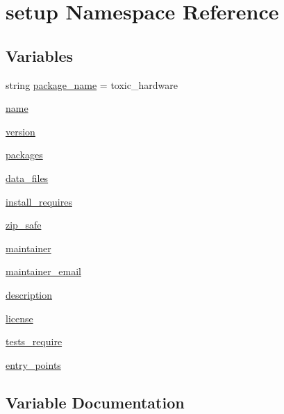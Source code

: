 \hypertarget{namespacesetup}{}\section{setup Namespace Reference}
\label{namespacesetup}
\subsection*{Variables}
\begin{DoxyCompactItemize}
\item 
string \mbox{\hyperlink{namespacesetup_a0e848632aafcba2ad3a320ab609dd6ab}{package\+\_\+name}} = \textquotesingle{}toxic\+\_\+hardware\textquotesingle{}
\item 
\mbox{\hyperlink{namespacesetup_ab3a7a0638d76a01367c5bc3cc699447f}{name}}
\item 
\mbox{\hyperlink{namespacesetup_a2aa722b36a933088812b50ea79b97a5c}{version}}
\item 
\mbox{\hyperlink{namespacesetup_aff2375a361fd5865c77bd9aa093be747}{packages}}
\item 
\mbox{\hyperlink{namespacesetup_ad027a8e9452da003dca32bf7467bd16e}{data\+\_\+files}}
\item 
\mbox{\hyperlink{namespacesetup_abead4f26b530856f858f0d44c7cf2588}{install\+\_\+requires}}
\item 
\mbox{\hyperlink{namespacesetup_a13510753661cb74083a0c664db11dde9}{zip\+\_\+safe}}
\item 
\mbox{\hyperlink{namespacesetup_aa1a7cf9bbf76004bb72697dc00bbee9d}{maintainer}}
\item 
\mbox{\hyperlink{namespacesetup_a92a81adbfdd219564d5246ce8d77f869}{maintainer\+\_\+email}}
\item 
\mbox{\hyperlink{namespacesetup_aedf461ec52a946bda975938ba0b93ec0}{description}}
\item 
\mbox{\hyperlink{namespacesetup_a8ed6f50a28bd6a8794f8e1153baa6de9}{license}}
\item 
\mbox{\hyperlink{namespacesetup_a6369bb060267ccf90b93519796e7cc2c}{tests\+\_\+require}}
\item 
\mbox{\hyperlink{namespacesetup_ada7058afc98897f073d3f3b8b9157059}{entry\+\_\+points}}
\end{DoxyCompactItemize}


\subsection{Variable Documentation}
\mbox{\label{namespacesetup_ad027a8e9452da003dca32bf7467bd16e}} 
